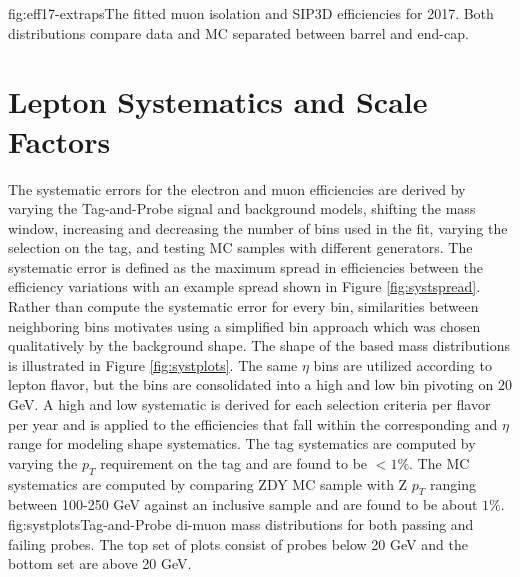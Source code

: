
%
          {fig:eff17-extraps}{The fitted muon isolation and SIP3D efficiencies for 2017. Both distributions compare data and MC separated between barrel and end-cap.  }




\FloatBarrier
\section{Lepton Systematics and Scale Factors}

The systematic errors for the electron and muon efficiencies are derived by varying the Tag-and-Probe signal and background models, shifting the mass window, increasing and decreasing the number of bins used in the fit, varying the selection on the tag, and testing MC samples with different generators. The systematic error is defined as the maximum spread in efficiencies between the efficiency variations with an example spread shown in Figure \ref{fig:systspread}.  Rather than compute the systematic error for every bin, similarities between neighboring bins motivates using a simplified bin approach which was chosen qualitatively by the background shape. The shape of the \pt based mass distributions is illustrated in Figure \ref{fig:systplots}. The same $\eta$ bins are utilized according to lepton flavor, but the \pt bins are consolidated into a high and low bin pivoting on $20$ GeV. A high and low systematic is derived for each selection criteria per flavor per year and is applied to the efficiencies that fall within the corresponding \pt and $\eta$ range for modeling shape systematics. The tag systematics are computed by varying the $p_T$ requirement on the tag and are found to be $<1\%$. The MC systematics are computed by comparing ZDY MC sample with Z $p_T$ ranging between 100-250 GeV against an inclusive sample and are found to be about $1\%$. 
%
	{fig:systplots}{Tag-and-Probe di-muon mass distributions for both passing and failing probes. The top set of plots consist of probes below 20 GeV and the bottom set are above 20 GeV.}
	


